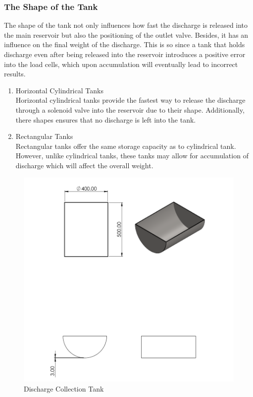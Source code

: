 \subsubsection{The Shape of the Tank}
\par
The shape of the tank not only influences how fast the discharge is released into the main reservoir but also the positioning of the outlet valve. Besides, it has an influence on the final weight of the discharge. This is so since a tank that holds discharge even after being released into the reservoir introduces a positive error into the load cells, which upon accumulation will eventually lead to incorrect results.
\begin{enumerate}
    \item Horizontal Cylindrical Tanks\\
    Horizontal cylindrical tanks provide the fastest way to release the discharge through a solenoid valve into the reservoir due to their shape. Additionally, there shapes ensures that no discharge is left into the tank. 
    \item Rectangular Tanks\\
    Rectangular tanks offer the same storage capacity as to cylindrical tank. However, unlike cylindrical tanks, these tanks may allow for accumulation of discharge which will affect the overall weight.
\end{enumerate}
\begin{figure}[H]
\includegraphics[width=0.9\linewidth]{Figures/tank.png}
\centering
\caption{Discharge Collection Tank }
\label{fig:tank}
\end{figure}

